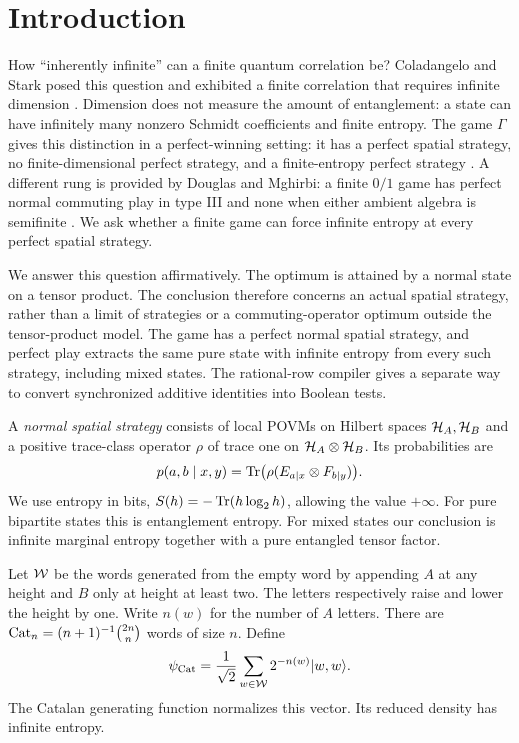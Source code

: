 \section{Introduction}\label{sec:intro}
How ``inherently infinite'' can a finite quantum correlation be? Coladangelo and Stark posed this question and exhibited a finite correlation that requires infinite dimension \cite{CS}. Dimension does not measure the amount of entanglement: a state can have infinitely many nonzero Schmidt coefficients and finite entropy. The game $\Gamma$ gives this distinction in a perfect-winning setting: it has a perfect spatial strategy, no finite-dimensional perfect strategy, and a finite-entropy perfect strategy \cite[Theorems 1.1 and 13.1]{Gamma}. A different rung is provided by Douglas and Mghirbi: a finite $0/1$ game has perfect normal commuting play in type III and none when either ambient algebra is semifinite \cite[Theorem 1.1]{ReadType}. We ask whether a finite game can force infinite entropy at every perfect spatial strategy.

We answer this question affirmatively. The optimum is attained by a normal state on a tensor product. The conclusion therefore concerns an actual spatial strategy, rather than a limit of strategies or a commuting-operator optimum outside the tensor-product model. The game has a perfect normal spatial strategy, and perfect play extracts the same pure state with infinite entropy from every such strategy, including mixed states. The rational-row compiler gives a separate way to convert synchronized additive identities into Boolean tests.

A \emph{normal spatial strategy} consists of local POVMs on Hilbert spaces $\mathcal H_A,\mathcal H_B$ and a positive trace-class operator $\rho$ of trace one on $\mathcal H_A\otimes\mathcal H_B$. Its probabilities are
\[
p(a,b\mid x,y)=\operatorname{Tr}\bigl(\rho(E_{a|x}\otimes F_{b|y})\bigr).
\]
We use entropy in bits, $S(h)=-\operatorname{Tr}(h\log_2h)$, allowing the value $+\infty$. For pure bipartite states this is entanglement entropy. For mixed states our conclusion is infinite marginal entropy together with a pure entangled tensor factor.

Let $\mathcal W$ be the words generated from the empty word by appending $A$ at any height and $B$ only at height at least two. The letters respectively raise and lower the height by one. Write $n(w)$ for the number of $A$ letters. There are $\operatorname{Cat}_n=(n+1)^{-1}\binom{2n}{n}$ words of size $n$. Define
\begin{equation}\label{eq:psicat}
 \psi_{\mathrm{Cat}}=\frac1{\sqrt2}\sum_{w\in\mathcal W}2^{-n(w)}|w,w\rangle.
\end{equation}
The Catalan generating function normalizes this vector. Its reduced density has infinite entropy.

